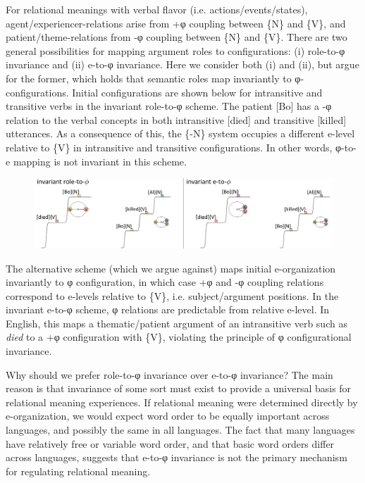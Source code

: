 For relational meanings with verbal flavor (i.e. actions/events/states), agent/experiencer-relations arise from +φ coupling between \{N\} and \{V\}, and patient/theme-relations from -φ coupling between \{N\} and \{V\}. There are two general possibilities for mapping argument roles to configurations: (i) role-to-φ invariance and (ii) e-to-φ invariance. Here we consider both (i) and (ii), but argue for the former, which holds that semantic roles map invariantly to φ-configurations. Initial configurations are shown below for intransitive and transitive verbs in the invariant role-to-φ scheme. The patient [Bo] has a -φ relation to the verbal concepts in both intransitive [died] and transitive [killed] utterances. As a consequence of this, the \{-N\} system occupies a different e-level relative to \{V\} in intransitive and transitive configurations. In other words, φ-to-e mapping is not invariant in this scheme.

  
\begin{figure}
\includegraphics[width=\textwidth]{figures/Tilsen-img71.png}
\caption{\missingcaption}
\label{fig:4:21}
\end{figure}
 

  The alternative scheme (which we argue against) maps initial e-organization invariantly to φ configuration, in which case +φ and -φ coupling relations correspond to e-levels relative to \{V\}, i.e. subject/argument positions. In the invariant e-to-φ scheme, φ relations are predictable from relative e-level. In English, this maps a thematic/patient argument of an intransitive verb such as \textit{died} to a +φ configuration with \{V\}, violating the principle of φ configurational invariance.

  Why should we prefer role-to-φ invariance over e-to-φ invariance? The main reason is that invariance of some sort must exist to provide a universal basis for relational meaning experiences. If relational meaning were determined directly by e-organization, we would expect word order to be equally important across languages, and possibly the same in all languages. The fact that many languages have relatively free or variable word order, and that basic word orders differ across languages, suggests that e-to-φ invariance is not the primary mechanism for regulating relational meaning. 

